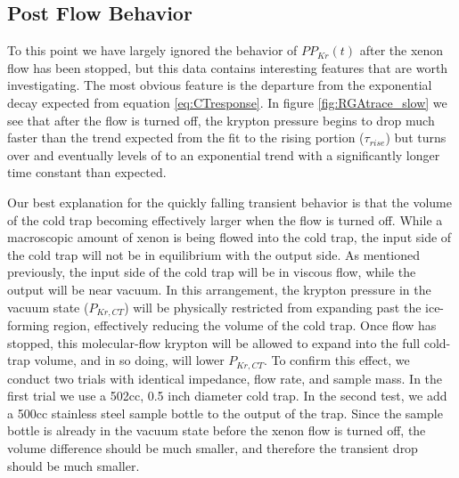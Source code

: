 \subsection{Post Flow Behavior}
To this point we have largely ignored the behavior of $PP_{Kr}(t)$ after the xenon flow has been stopped, but this data contains interesting features that are worth investigating. The most obvious feature is the departure from the exponential decay expected from equation \ref{eq:CTresponse}. In figure \ref{fig:RGAtrace_slow} we see that after the flow is turned off, the krypton pressure begins to drop much faster than the trend expected from the fit to the rising portion ($\tau_{rise}$) but turns over and eventually levels of to an exponential trend with a significantly longer time constant than expected. 

Our best explanation for the quickly falling transient behavior is that the volume of the cold trap becoming effectively larger when the flow is turned off. While a macroscopic amount of xenon is being flowed into the cold trap, the input side of the cold trap will not be in equilibrium with the output side. As mentioned previously, the input side of the cold trap will be in viscous flow, while the output will be near vacuum. In this arrangement, the krypton pressure in the vacuum state ($P_{Kr,CT}$) will be physically restricted from expanding past the ice-forming region, effectively reducing the volume of the cold trap. Once flow has stopped, this molecular-flow krypton will be allowed to expand into the full cold-trap volume, and in so doing, will lower $P_{Kr,CT}$. To confirm this effect, we conduct two trials with identical impedance, flow rate, and sample mass. In the first trial we use a 502cc, 0.5 inch diameter cold trap. In the second test, we add a 500cc stainless steel sample bottle to the output of the trap. Since the sample bottle is already in the vacuum state before the xenon flow is turned off, the volume difference should be much smaller, and therefore the transient drop should be much smaller. 

